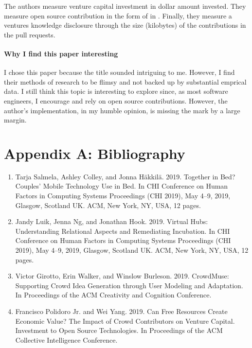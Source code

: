 The authors measure venture capital investment in dollar amount invested. They measure open source contribution in the form of  in . Finally, they measure a ventures knowledge disclosure through the size (kilobytes) of the contributions in the pull requests.

\paragraph{Why I find this paper interesting}
I chose this paper because the title sounded intriguing to me. However, I find their methods of research to be flimsy and not backed up by substantial emprical data. I still think this topic is interesting to explore since, as most software engineers, I encourage and rely on open source contributions. However, the author's implementation, in my humble opinion, is missing the mark by a large margin.

\clearpage

\section{Appendix A: Bibliography}

\begin{enumerate}
\item
  Tarja Salmela, Ashley Colley, and Jonna Häkkilä. 2019. Together in Bed? Couples’ Mobile Technology Use in Bed. In CHI Conference on Human Factors in Computing Systems Proceedings (CHI 2019), May 4–9, 2019, Glasgow, Scotland UK. ACM, New York, NY, USA, 12 pages. 
\item
  Jandy Luik, Jenna Ng, and Jonathan Hook. 2019. Virtual Hubs: Understanding Relational Aspects and Remediating Incubation. In CHI Conference on Human Factors in Computing Systems Proceedings (CHI 2019), May 4–9, 2019, Glasgow, Scotland UK. ACM, New York, NY, USA, 12 pages. 
\item
  Victor Girotto, Erin Walker, and Winslow Burleson. 2019. CrowdMuse: Supporting Crowd Idea Generation through User Modeling and Adaptation. In Proceedings of the ACM Creativity and Cognition Conference. 
\item
  Francisco Polidoro Jr. and Wei Yang. 2019. Can Free Resources Create Economic Value? The Impact of Crowd Contributors on Venture Capital. Investment to Open Source Technologies. In Proceedings of the ACM Collective Intelligence Conference. 
\end{enumerate}

